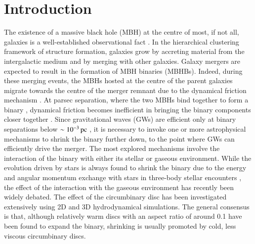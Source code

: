 \documentclass{aa}
\begin{document}
   \maketitle
%
\section{Introduction}

The existence of a massive black hole (MBH) at the centre of most, if not all, galaxies is a well-established observational fact \citep[][and references therein]{Kormendy2013}. In the hierarchical clustering framework of structure formation, galaxies grow by accreting material from the intergalactic medium and by merging with other galaxies. Galaxy mergers are expected to result in the formation of MBH binaries (MBHBs). Indeed, during these merging events, the MBHs hosted at the centre of the parent galaxies migrate towards the centre of the merger remnant due to the dynamical friction mechanism \citep{Chandrasekhar1943}.
At parsec separation, where the two MBHs bind together to form a binary \citep{Begelman1980}, dynamical friction becomes inefficient in bringing the binary components closer together \citep{Mayer2007b,Dotti2012}. 
Since gravitational waves (GWs) are efficient only at binary separations below $\sim 10^{-3} \rm \, pc$ , it is necessary to invoke one or more astrophysical mechanisms to shrink the binary further down, to the point where GWs can efficiently drive the merger. 
The most explored mechanisms involve the interaction of the binary with either its stellar \citep{Quinlan1996,Khan2011,2011ApJ...732L..26P} or gaseous \citep{ArmitageNatarajan2002,Escala2005,Lodato2009,Cuadra2009} environment. While the evolution driven by stars is always found to shrink the binary due to the energy and angular momentum exchange with stars in three-body stellar encounters \citep[e.g.][]{Sesana2007,Bortolas2021}, the effect of the interaction with the gaseous environment has recently been widely debated.
The effect of the circumbinary disc has been investigated extensively using 2D \citep{Munoz2019,Duffell2019,Tiede2020, Siwek2023} and 3D \citep{HeathNixon2020,Franchini2021,Franchini2022,Franchini2023} hydrodynamical simulations. The general consensus is that, although relatively warm discs with an aspect ratio of around 0.1 have been found to expand the binary, shrinking is usually promoted by cold, less viscous circumbinary discs.
\end{document}
